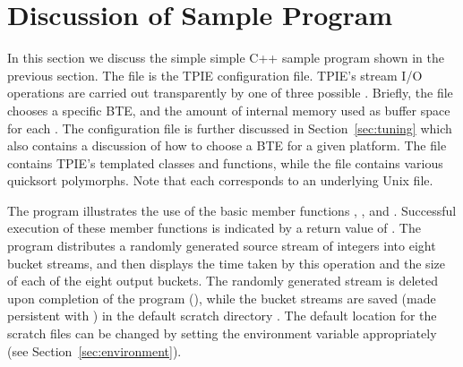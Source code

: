 

\section{Discussion of Sample Program}

In this section we discuss the simple simple C++ sample
program shown in the previous section. The file
 is the TPIE configuration file. TPIE's
 stream I/O operations are carried out
transparently by one of three possible . Briefly, the file  chooses
a specific BTE, and the amount of internal memory used as
buffer space for each . The
 configuration file is further discussed
in Section~\ref{sec:tuning} which also contains a discussion
of how to choose a BTE for a given platform. The file
 contains TPIE's templated classes and
functions, while the file  contains
various quicksort polymorphs. Note that each
 corresponds to an underlying Unix file.

The program illustrates the use of the basic
 member functions ,
,  and .
Successful execution of these member functions is indicated
by a return value of .  The program
distributes a randomly generated source stream of integers
into eight bucket streams, and then displays the time taken
by this operation and the size of each of the eight output
buckets. The randomly generated stream is deleted upon
completion of the program
(), while the bucket
streams are saved (made persistent with
) in the
default scratch directory . The default
location for the scratch files can be changed by setting the environment variable
 appropriately (see
Section~\ref{sec:environment}).

